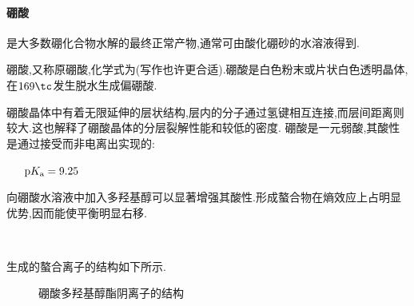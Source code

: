 \documentclass{ctexart}
\begin{document}
\paragraph{硼酸}
是大多数硼化合物水解的最终正常产物,通常可由酸化硼砂的水溶液得到.
\begin{substance}[\ce{H3BO3}]
    硼酸,又称原硼酸,化学式为(写作也许更合适).硼酸是白色粉末或片状白色透明晶体,在$169\tc$发生脱水生成偏硼酸.
\end{substance}
硼酸晶体中有着无限延伸的层状结构,层内的分子通过氢键相互连接,而层间距离则较大.这也解释了硼酸晶体的分层裂解性能和较低的密度.
\indent 硼酸是一元弱酸,其酸性是通过接受而非电离出实现的:
\begin{center}
    \ \ \ $\text pK_\text a=9.25$
\end{center}
向硼酸水溶液中加入多羟基醇可以显著增强其酸性.形成螯合物在熵效应上占明显优势,因而能使平衡明显右移.
\begin{center}
    \\
\end{center}
生成的螯合离子的结构如下所示.
\begin{figure}[H]
    \caption{硼酸多羟基醇酯阴离子的结构}
\end{figure}
\end{document}
